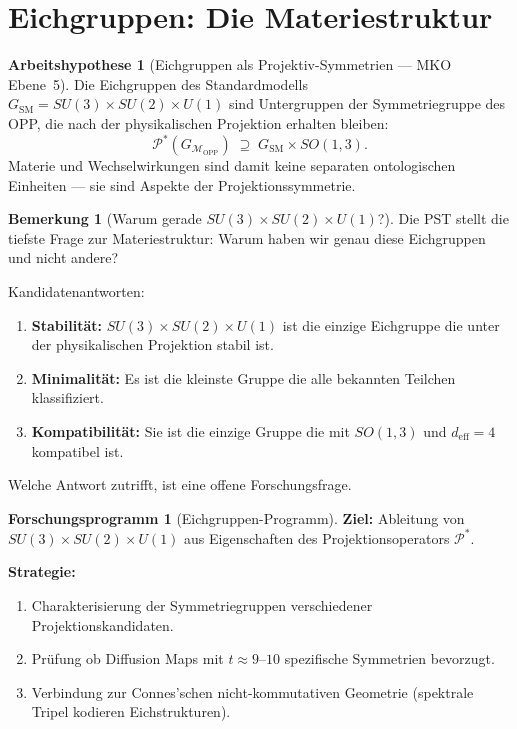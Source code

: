 \documentclass[11pt,a4paper]{article}
\theoremstyle{plain}
\theoremstyle{definition}
\newtheorem{remark}{Bemerkung}[section]
\newtheorem{hypothese}{Arbeitshypothese}[section]
\newtheorem{programm}{Forschungsprogramm}[section]
\newcommand{\OPP}{\mathcal{M}_{\mathrm{OPP}}}
\newcommand{\deff}{d_{\mathrm{eff}}}
\newcommand{\Proj}{\mathcal{P}}
\begin{document}
\section{Eichgruppen: Die Materiestruktur}

\begin{hypothese}[Eichgruppen als Projektiv-Symmetrien --- MKO Ebene~5]
Die Eichgruppen des Standardmodells
$G_{\text{SM}} = SU(3) \times SU(2) \times U(1)$
sind Untergruppen der Symmetriegruppe des OPP, die nach der physikalischen
Projektion erhalten bleiben:
\[
  \Proj^\ast(G_{\OPP}) \;\supseteq\; G_{\text{SM}} \times SO(1,3).
\]
Materie und Wechselwirkungen sind damit keine separaten ontologischen
Einheiten --- sie sind Aspekte der Projektionssymmetrie.
\end{hypothese}

\begin{remark}[Warum gerade $SU(3) \times SU(2) \times U(1)$?]
Die PST stellt die tiefste Frage zur Materiestruktur: Warum haben wir
genau diese Eichgruppen und nicht andere?

Kandidatenantworten:
\begin{enumerate}
  \item \textbf{Stabilit\"{a}t:} $SU(3) \times SU(2) \times U(1)$ ist
        die einzige Eichgruppe die unter der physikalischen Projektion
        stabil ist.
  \item \textbf{Minimalit\"{a}t:} Es ist die kleinste Gruppe die alle
        bekannten Teilchen klassifiziert.
  \item \textbf{Kompatibilit\"{a}t:} Sie ist die einzige Gruppe die mit
        $SO(1,3)$ und $\deff = 4$ kompatibel ist.
\end{enumerate}
Welche Antwort zutrifft, ist eine offene Forschungsfrage.
\end{remark}

\begin{programm}[Eichgruppen-Programm]
\textbf{Ziel:} Ableitung von $SU(3) \times SU(2) \times U(1)$ aus
Eigenschaften des Projektionsoperators $\Proj^\ast$.

\textbf{Strategie:}
\begin{enumerate}
  \item Charakterisierung der Symmetriegruppen verschiedener
        Projektionskandidaten.
  \item Pr\"{u}fung ob Diffusion Maps mit $t \approx 9$--$10$ spezifische
        Symmetrien bevorzugt.
  \item Verbindung zur Connes'schen nicht-kommutativen Geometrie
        (spektrale Tripel kodieren Eichstrukturen).
\end{enumerate}
\end{programm}
\end{document}

